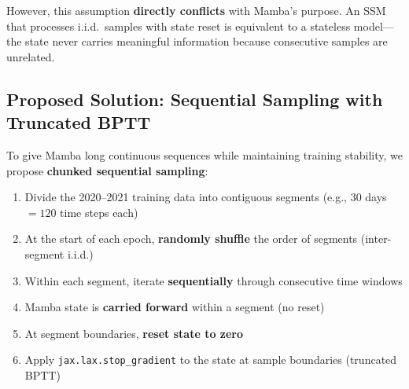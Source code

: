 \documentclass[11pt,a4paper]{article}
\begin{document}
However, this assumption \textbf{directly conflicts} with Mamba's purpose. An SSM that processes i.i.d.\ samples with state reset is equivalent to a stateless model---the state never carries meaningful information because consecutive samples are unrelated.

\subsection{Proposed Solution: Sequential Sampling with Truncated BPTT}

To give Mamba long continuous sequences while maintaining training stability, we propose \textbf{chunked sequential sampling}:

\begin{enumerate}[nosep]
  \item Divide the 2020--2021 training data into contiguous segments (e.g., 30 days $= 120$ time steps each)
  \item At the start of each epoch, \textbf{randomly shuffle} the order of segments (inter-segment i.i.d.)
  \item Within each segment, iterate \textbf{sequentially} through consecutive time windows
  \item Mamba state is \textbf{carried forward} within a segment (no reset)
  \item At segment boundaries, \textbf{reset state to zero}
  \item Apply \texttt{jax.lax.stop\_gradient} to the state at sample boundaries (truncated BPTT)
\end{enumerate}
\end{document}
